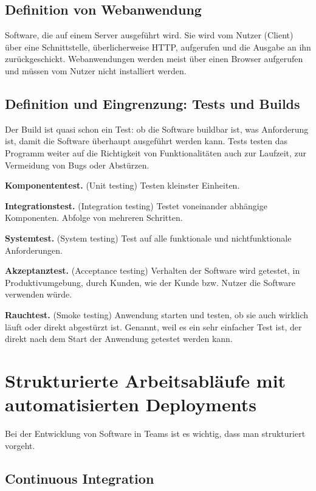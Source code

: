 \subsection{Definition von Webanwendung}

Software, die auf einem Server ausgeführt wird. Sie wird vom Nutzer (Client) über eine Schnittstelle, überlicherweise \ac{HTTP}, aufgerufen und die Ausgabe an ihn zurückgeschickt. Webanwendungen werden meist über einen Browser aufgerufen und müssen vom Nutzer nicht installiert werden.


\subsection{Definition und Eingrenzung: Tests und Builds}

Der Build ist quasi schon ein Test: ob die Software buildbar ist, was Anforderung ist, damit die Software überhaupt ausgeführt werden kann. Tests testen das Programm weiter auf die Richtigkeit von Funktionalitäten auch zur Laufzeit, zur Vermeidung von Bugs oder Abstürzen.

\textbf{Komponententest.} (Unit testing) Testen kleinster Einheiten.

\textbf{Integrationstest.} (Integration testing) Testet voneinander abhängige Komponenten. Abfolge von mehreren Schritten.

\textbf{Systemtest.} (System testing) Test auf alle funktionale und nichtfunktionale Anforderungen.

\textbf{Akzeptanztest.} (Acceptance testing) Verhalten der Software wird getestet, in Produktivumgebung, durch Kunden, wie der Kunde bzw. Nutzer die Software verwenden würde.

\textbf{Rauchtest.} (Smoke testing) Anwendung starten und testen, ob sie auch wirklich läuft oder direkt abgestürzt ist. Genannt, weil es ein sehr einfacher Test ist, der direkt nach dem Start der Anwendung getestet werden kann.


\section{Strukturierte Arbeitsabläufe mit automatisierten Deployments}

Bei der Entwicklung von Software in Teams ist es wichtig, dass man strukturiert vorgeht.

\subsection{Continuous Integration}

